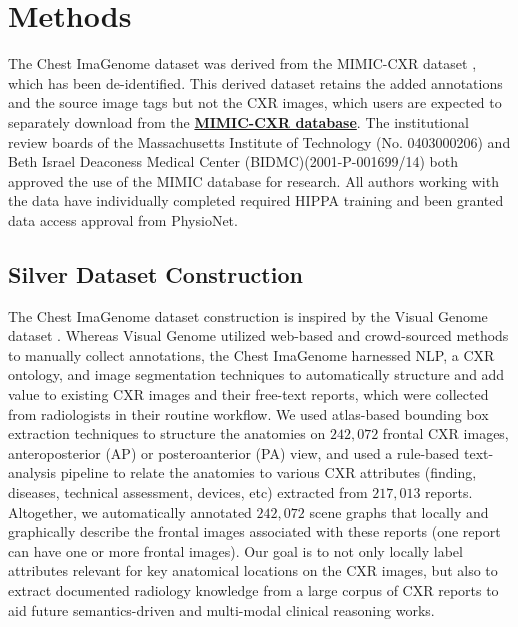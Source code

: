 \section*{Methods}

The Chest ImaGenome dataset was derived from the MIMIC-CXR dataset \cite{johnson2019mimic}, which has been de-identified. This derived dataset retains the added annotations and the source image tags but not the CXR images, which users are expected to separately download from the \href{https://PhysioNet.org/content/mimic-cxr/2.0.0/}{\textbf{MIMIC-CXR database}}. The institutional review boards of the Massachusetts Institute of Technology (No. 0403000206) and Beth Israel Deaconess Medical Center (BIDMC)(2001-P-001699/14) both approved the use of the MIMIC database for research. All authors working with the data have individually completed required HIPPA training and been granted data access approval from PhysioNet.

\vspace{-5pt}
\subsection*{Silver Dataset Construction}
\vspace{-2pt}
The Chest ImaGenome dataset construction is inspired by the Visual Genome dataset \cite{krishna2017visual}. Whereas Visual Genome utilized web-based and crowd-sourced methods to manually collect annotations, the Chest ImaGenome harnessed NLP, a CXR ontology, and image segmentation techniques to automatically structure and add value to existing CXR images and their free-text reports, which were collected from radiologists in their routine workflow. We used atlas-based bounding box extraction techniques to structure the anatomies on $242,072$ frontal CXR images, anteroposterior (AP) or posteroanterior (PA) view, and used a rule-based text-analysis pipeline to relate the anatomies to various CXR attributes (finding, diseases, technical assessment, devices, etc) extracted from $217,013$ reports. Altogether, we automatically annotated $242,072$ scene graphs that locally and graphically describe the frontal images associated with these reports (one report can have one or more frontal images). Our goal is to not only locally label attributes relevant for key anatomical locations on the CXR images, but also to extract documented radiology knowledge from a large corpus of CXR reports to aid future semantics-driven and multi-modal clinical reasoning works. 

